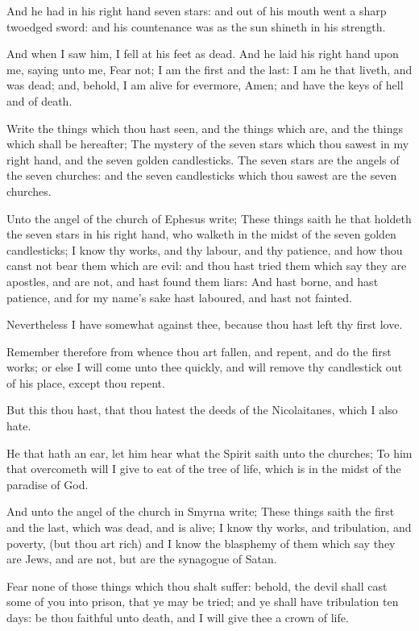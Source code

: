 \Verse And he had in his right hand seven stars: and out of his mouth went a sharp twoedged sword: and his countenance was as the sun shineth in his strength.

\Verse And when I saw him, I fell at his feet as dead. And he laid his right hand upon me, saying unto me, Fear not; I am the first and the last: \Verse I am he that liveth, and was dead; and, behold, I am alive for evermore, Amen; and have the keys of hell and of death.

\Verse Write the things which thou hast seen, and the things which are, and the things which shall be hereafter; \Verse The mystery of the seven stars which thou sawest in my right hand, and the seven golden candlesticks. The seven stars are the angels of the seven churches: and the seven candlesticks which thou sawest are the seven churches.

\Chapter
\Verse Unto the angel of the church of Ephesus write; These things saith he that holdeth the seven stars in his right hand, who walketh in the midst of the seven golden candlesticks; \Verse I know thy works, and thy labour, and thy patience, and how thou canst not bear them which are evil: and thou hast tried them which say they are apostles, and are not, and hast found them liars: \Verse And hast borne, and hast patience, and for my name's sake hast laboured, and hast not fainted.

\Verse Nevertheless I have somewhat against thee, because thou hast left thy first love.

\Verse Remember therefore from whence thou art fallen, and repent, and do the first works; or else I will come unto thee quickly, and will remove thy candlestick out of his place, except thou repent.

\Verse But this thou hast, that thou hatest the deeds of the Nicolaitanes, which I also hate.

\Verse He that hath an ear, let him hear what the Spirit saith unto the churches; To him that overcometh will I give to eat of the tree of life, which is in the midst of the paradise of God.

\Verse And unto the angel of the church in Smyrna write; These things saith the first and the last, which was dead, and is alive; \Verse I know thy works, and tribulation, and poverty, (but thou art rich) and I know the blasphemy of them which say they are Jews, and are not, but are the synagogue of Satan.

\Verse Fear none of those things which thou shalt suffer: behold, the devil shall cast some of you into prison, that ye may be tried; and ye shall have tribulation ten days: be thou faithful unto death, and I will give thee a crown of life.

